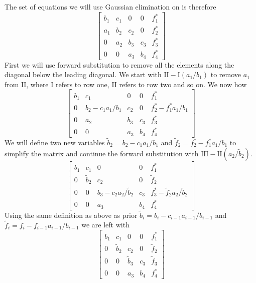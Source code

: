 \documentclass[10pt, a4paper]{amsart}
\begin{document}
The set of equations we will use Gaussian elimination on is therefore 
\begin{equation}
 \left[
  \begin{array}{cccc|c}
	b_1 & c_1 & 0 & 0 & f^*_1\\
	a_1 & b_2 & c_2 & 0 & f^*_2\\
	0 & a_2 & b_3 & c_3 & f^*_3\\
	0 & 0 & a_3 & b_4 & f^*_4
  \end{array}
 \right]
\end{equation}
First we will use forward substitution to remove all the elements along the diagonal below the leading diagonal. We start with $\textrm{II} - \textrm{I}(a_1/b_1)$ to remove $a_1$ from $\textrm{II}$, where \textrm{I} refers to row one, \textrm{II} refers to row two and so on. We now how 
\begin{equation}
	\left[
  \begin{array}{cccc|c}
	b_1 & c_1 & 0 & 0 & f^*_1\\
	0 & b_2- c_1a_1/b_1 & c_2 & 0 & f^*_2 - f^*_1a_1/b_1\\
	0 & a_2 & b_3 & c_3 & f^*_3\\
	0 & 0 & a_3 & b_4 & f^*_4
  \end{array}
 \right]
\end{equation}
We will define two new variables $\tilde{b}_2 =b_2- c_1a_1/b_1 $ and $\tilde{f}_2 = f^*_2 - f^*_1a_1/b_1$ to simplify the matrix and continue the forward substitution with $\textrm{III} - \textrm{II}(a_2/\tilde{b}_2)$.
\begin{equation}
 \left[
  \begin{array}{cccc|c}
	b_1 & c_1 & 0 & 0 & f^*_1\\
	0 & \tilde{b}_2 & c_2 & 0 & \tilde{f}_2\\
	0 & 0 & b_3-c_2a_2/\tilde{b}_2 & c_3 & f^*_3-\tilde{f}_2a_2/\tilde{b}_2\\
	0 & 0 & a_3 & b_4 & f^*_4
  \end{array}
 \right]
\end{equation}
Using the same definition as above as prior $\tilde{b}_i = b_i -c_{i-1}a_{i-1}/b_{i-1}$ and $\tilde{f}_i = f_i - f_{i-1}a_{i-1}/b_{i-1}$ we are left with 
\begin{equation}
\left[
  \begin{array}{cccc|c}
	b_1 & c_1 & 0 & 0 & f^*_1\\
	0 & \tilde{b}_2 & c_2 & 0 & \tilde{f}_2\\
	0 & 0 & \tilde{b}_3 & c_3 & \tilde{f}_3\\
	0 & 0 & a_3 & b_4 & f^*_4
  \end{array}
 \right]
\end{equation}
\end{document}
